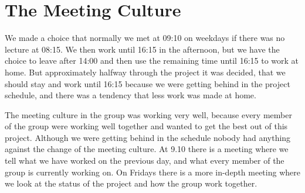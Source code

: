 \section{The Meeting Culture}
We made a choice that normally we met at 09:10 on weekdays if there was no lecture at 08:15. We then work until 16:15 in the afternoon, but we have the choice to leave after 14:00 and then use the remaining time  until 16:15 to work at home. But approximately halfway through the project it was decided, that we should stay and work until 16:15 because we were getting behind in the project schedule, and there was a tendency that less work was made at home.

The meeting culture in the group was working very well, because every member of the group were working well together and wanted to get the best out of this project. Although we were getting behind in the schedule nobody had anything against the change of the meeting culture. At 9.10 there is a meeting where we tell what we have worked on the previous day, and what every member of the group is currently working on. On Fridays there is a more in-depth meeting where we look at the status of the project and how the group work together.
